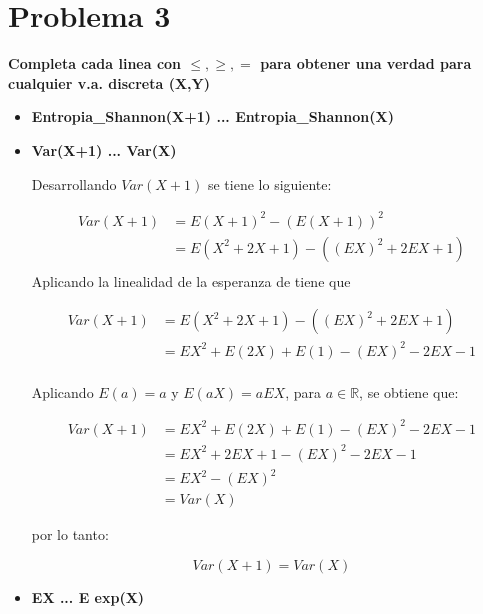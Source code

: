 \section*{Problema 3}

\textbf{Completa cada linea con $\leq , \geq, =$ para obtener una verdad para cualquier v.a. discreta (X,Y)}
\begin{itemize}
    \item \textbf{Entropia\_Shannon(X+1) ... Entropia\_Shannon(X)}
    \item \textbf{Var(X+1) ... Var(X)}

          Desarrollando $Var(X+1)$ se tiene lo siguiente:

          \begin{align*}
              Var(X+1) & = E(X+1)^2-(E(X+1))^2         \\
                       & = E(X^2+2X+1)- ((EX)^2+2EX+1) \\
          \end{align*}
          Aplicando la linealidad de la esperanza de tiene que

          \begin{align*}
              Var(X+1) & =E(X^2+2X+1)- ((EX)^2+2EX+1)           \\
                       & = EX^2 + E(2X) + E(1) - (EX)^2 -2EX -1 \\
          \end{align*}


          Aplicando $E(a)=a$ y $E(aX)=aEX$, para $a\in \mathbb{R}$, se obtiene que:

          \begin{align*}
              Var(X+1) & = EX^2 + E(2X) + E(1) - (EX)^2 -2EX -1 \\
                       & = EX^2 +2EX +1 -(EX)^2 -2EX -1         \\
                       & = EX^2 -(EX)^2                         \\
                       & = Var(X)
          \end{align*}

          por lo tanto:

          \begin{equation*}
              Var(X+1) = Var(X)
          \end{equation*}
    \item \textbf{EX ... E exp(X)}
\end{itemize}